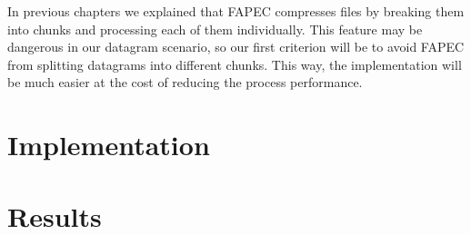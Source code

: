 In previous chapters we explained that FAPEC compresses files by breaking them into chunks and processing each of them individually. This feature may be dangerous in our datagram scenario, so our first criterion will be to avoid FAPEC from splitting datagrams into different chunks. This way, the implementation will be much easier at the cost of reducing the process performance.

\section{Implementation}

\section{Results}

